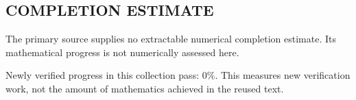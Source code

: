 
\subsection*{COMPLETION ESTIMATE}
The primary source supplies no extractable numerical completion estimate. Its mathematical progress is not numerically assessed here.

Newly verified progress in this collection pass: $0\%$. This measures new verification work, not the amount of mathematics achieved in the reused text.
